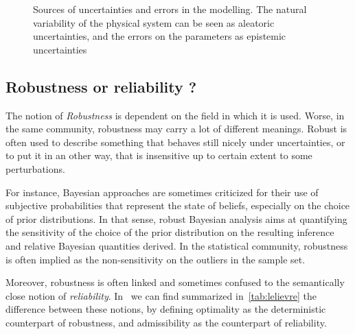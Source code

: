 \documentclass[../../Main_ManuscritThese.tex]{subfiles}
\begin{document}
\begin{figure}[ht]
  \begin{center}
  \resizebox{\linewidth}{!}
  {
      
    }
    \end{center}
  \caption{\label{fig:sources_uncertainties} Sources of uncertainties and errors in the modelling. The natural variability of the physical system can be seen as aleatoric uncertainties, and the errors on the parameters as epistemic uncertainties}
\end{figure}

\subsection{Robustness or reliability ?}


The notion of \emph{Robustness} is dependent on the field in which it is used. Worse, in the same community, robustness may carry a lot of different meanings. Robust is often used to describe something that behaves still nicely under uncertainties, or to put it in an other way, that is insensitive up to certain extent to some perturbations.

For instance, Bayesian approaches are sometimes criticized for their use of subjective probabilities that represent the state of beliefs, especially on the choice of prior distributions. In that sense, robust Bayesian analysis aims at quantifying the sensitivity of the choice of the prior distribution on the resulting inference and relative Bayesian quantities derived. In the statistical community, robustness is often implied as the non-sensitivity on the outliers in the sample set.

Moreover, robustness is often linked and sometimes confused to the semantically close notion of \emph{reliability}. In~\cite{lelievre_consideration_2016} we can find summarized in~\cref{tab:lelievre} the difference between these notions,  by defining optimality as the deterministic counterpart of robustness, and admissibility as the counterpart of reliability.
\end{document}
